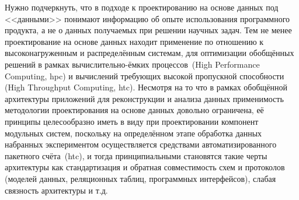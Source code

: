 Нужно подчеркнуть, что в подходе к проектированию на основе данных
под <<данными>> понимают информацию об опыте использования
программного продукта, а не о данных получаемых
при решении научных задач. Тем не менее проектирование на основе
данных находит применение по отношению к высоконагруженным и распределённым
системам, для оптимизации обобщённых
решений в рамках вычислительно-ёмких
процессов~(High Performance Computing, \acrshort{hpc})
и вычислений требующих высокой пропускной
способности (High Throughput Computing, \acrshort{htc}).
Несмотря на то что в рамках обобщённой архитектуры приложений для
реконструкции и анализа данных применимость методологии проектирования
на основе данных довольно ограничена, её принципы целесообразно иметь
в виду при проектировании
компонент модульных систем, поскольку на определённом этапе обработка
данных набранных экспериментом осуществляется средствами автоматизированного
пакетного счёта~(\acrshort{htc}), и тогда принципиальными становятся такие черты
архитектуры как стандартизация и обратная совместимость схем и протоколов
(моделей данных, реляционных таблиц, программных интерфейсов),
слабая связность архитектуры и т.д.

